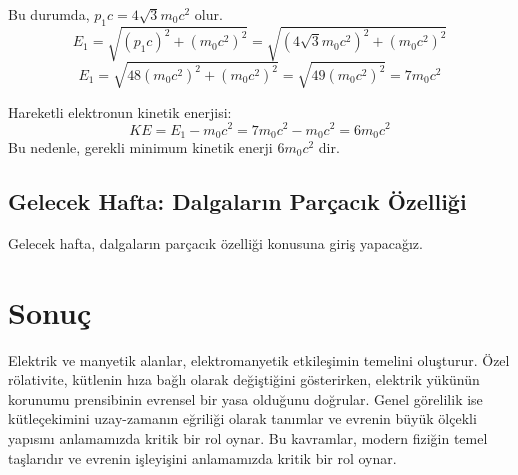 \documentclass[11pt,letterpaper,twocolumn]{fenbil}
\begin{document}
Bu durumda, \( p_1c = 4\sqrt{3} m_0c^2 \) olur.
\[ E_1 = \sqrt{(p_1c)^2 + (m_0c^2)^2} = \sqrt{(4\sqrt{3} m_0c^2)^2 + (m_0c^2)^2} \]
\[ E_1 = \sqrt{48(m_0c^2)^2 + (m_0c^2)^2} = \sqrt{49(m_0c^2)^2} = 7m_0c^2 \]

Hareketli elektronun kinetik enerjisi:
\[ KE = E_1 - m_0c^2 = 7m_0c^2 - m_0c^2 = 6m_0c^2 \]
Bu nedenle, gerekli minimum kinetik enerji \( 6m_0c^2 \) dir.

\subsection{Gelecek Hafta: Dalgaların Parçacık Özelliği}
Gelecek hafta, dalgaların parçacık özelliği konusuna giriş yapacağız.

\section{Sonuç}
Elektrik ve manyetik alanlar, elektromanyetik etkileşimin temelini oluşturur. Özel rölativite, kütlenin hıza bağlı olarak değiştiğini gösterirken, elektrik yükünün korunumu prensibinin evrensel bir yasa olduğunu doğrular. Genel görelilik ise kütleçekimini uzay-zamanın eğriliği olarak tanımlar ve evrenin büyük ölçekli yapısını anlamamızda kritik bir rol oynar. Bu kavramlar, modern fiziğin temel taşlarıdır ve evrenin işleyişini anlamamızda kritik bir rol oynar.
\end{document}

